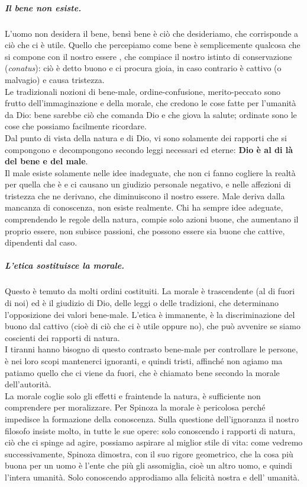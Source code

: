 \subparagraph{Il bene non esiste.} L'uomo non desidera il bene, bensì bene è ciò che desideriamo, che corrisponde a ciò che ci è utile. Quello che percepiamo come bene è semplicemente qualcosa che si compone con il nostro essere , che compiace il nostro istinto di conservazione (\textit{conatus}): ciò è detto buono e ci procura gioia, in caso contrario è cattivo (o malvagio) e causa tristezza.\\
Le tradizionali nozioni di bene-male, ordine-confusione, merito-peccato sono frutto dell'immaginazione e della morale, che credono le cose fatte per l'umanità da Dio: bene sarebbe ciò che comanda Dio e che giova la salute; ordinate sono le cose che possiamo facilmente ricordare.\\
Dal punto di vista della natura e di Dio, vi sono solamente dei rapporti che si compongono e decompongono secondo leggi necessari ed eterne: \textbf{Dio è al di là del bene e del male}.\\
Il male esiste solamente nelle idee inadeguate, che non ci fanno cogliere la realtà per quella che è e ci causano un giudizio personale negativo, e nelle affezioni di tristezza che ne derivano, che diminuiscono il nostro essere. Male deriva dalla mancanza di conoscenza, non esiste realmente. Chi ha sempre idee adeguate, comprendendo le regole della natura, compie solo azioni buone, che aumentano il proprio essere, non subisce passioni, che possono essere sia buone che cattive, dipendenti dal caso.
\subparagraph{L'etica sostituisce la morale.} Questo è  temuto da molti ordini costituiti. La morale è trascendente (al di fuori di noi) ed è il giudizio di Dio, delle leggi  o delle tradizioni, che determinano l'opposizione dei valori bene-male. L'etica è immanente, è la discriminazione del buono dal cattivo (cioè di ciò che ci è utile oppure no), che può avvenire se siamo coscienti dei rapporti di natura.\\ I tiranni hanno bisogno di questo contrasto bene-male per controllare le persone, è nei loro scopi mantenerci ignoranti, e quindi tristi, affinché non agiamo ma patiamo quello che ci viene da fuori, che è chiamato bene secondo la morale dell'autorità.\\
La morale coglie solo gli effetti e fraintende la natura, è sufficiente non comprendere per moralizzare. Per Spinoza la morale è pericolosa perché impedisce la formazione della conoscenza. Sulla questione dell'ignoranza il nostro filosofo insiste molto, in tutte le sue opere: solo conoscendo i rapporti di natura, ciò che ci spinge ad agire, possiamo aspirare al miglior stile di vita: come vedremo successivamente, Spinoza dimostra, con il suo rigore geometrico, che la cosa più buona per un uomo è l'ente che più gli assomiglia, cioè un altro uomo, e quindi l'intera umanità. Solo conoscendo approdiamo alla felicità nostra e dell' umanità.
